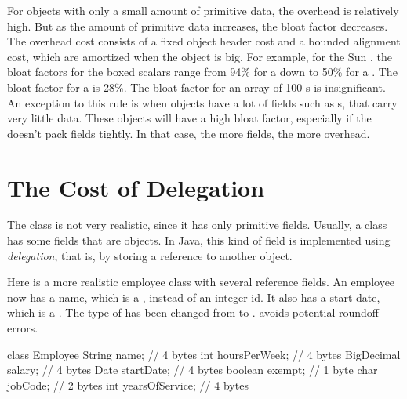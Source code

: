 
For objects with only a small amount of primitive data, the overhead is relatively high. 
But as the amount of primitive data increases, the bloat factor decreases. 
The overhead cost consists of a fixed object header cost and a bounded alignment cost,
which are amortized when the object is big.  For example, for the Sun \jre, the bloat factors for the boxed
scalars range from 94\% for a  down to 50\% for a
.  The bloat factor for a  is 28\%.  The
bloat factor for an array of 100 s is insignificant.  
An exception to this rule is when objects
have a lot of fields such as s, that carry very little data. 
These objects will have a high bloat factor, especially if the \jre doesn't pack
fields tightly. In that case, the more fields, the more overhead.

\section{The Cost of Delegation}

The  class is not very realistic, since it has only
primitive fields. Usually, a class has some fields that are objects. In Java,
this kind of field is implemented using
\textit{delegation}, that is, by storing a reference to another object. 

Here is a more realistic employee class with several reference fields. An
employee now has a name, which is a , instead of an integer id. It
also has a start date, which is a . The type of  has
been changed from  to .  avoids potential roundoff errors.
\begin{shortlisting} 
class Employee {
    String name;                // 4 bytes
    int hoursPerWeek;           // 4 bytes
    BigDecimal salary;          // 4 bytes
    Date startDate;             // 4 bytes
    boolean exempt;             // 1 byte
    char jobCode;               // 2 bytes
    int yearsOfService;         // 4 bytes
}
\end{shortlisting}


